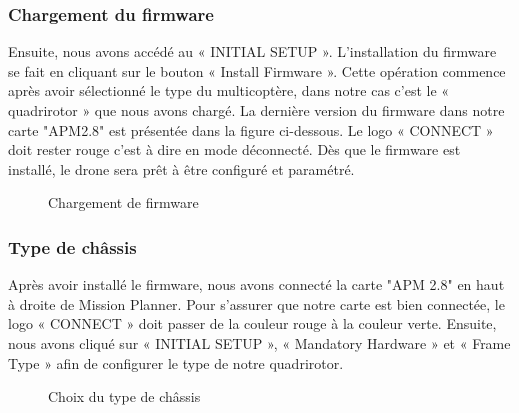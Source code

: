 	\subsubsection{Chargement du firmware }
	Ensuite, nous avons accédé au « INITIAL SETUP ». L'installation du firmware se fait en cliquant sur le bouton « Install Firmware ». Cette opération commence après avoir sélectionné le type du multicoptère, dans notre cas c'est le « quadrirotor » que nous avons chargé. La dernière version du firmware dans
	notre carte "APM2.8" est présentée dans la figure ci-dessous. Le logo « CONNECT » doit rester rouge c'est à dire en mode déconnecté. Dès que le firmware est installé, le drone sera prêt à être configuré et paramétré.
	\begin{figure}[H]
		\begin{center}
			\centering
		\end{center}
		\caption{Chargement de firmware}
	\end{figure}
	\vskip 1cm
	
	\subsubsection{Type de châssis}
	Après avoir installé le firmware, nous avons connecté  la carte "APM 2.8" en haut à droite de Mission Planner. Pour s'assurer que notre carte est bien connectée, le logo « CONNECT » doit passer de la couleur rouge à la couleur verte. Ensuite, nous avons cliqué sur « INITIAL SETUP », « Mandatory Hardware » et « Frame Type » afin de configurer le type de notre quadrirotor. 
	\begin{figure}[H]
		\begin{center}
			\centering
		\end{center}
		\caption{Choix du type de châssis}
	\end{figure}
